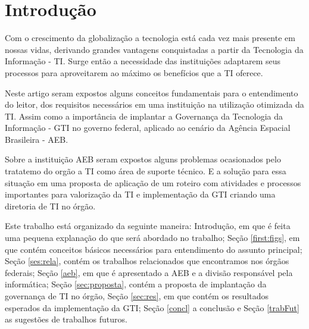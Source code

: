 \section*{Introdução}
Com o crescimento da globalização a tecnologia está cada vez mais presente em nossas vidas, derivando grandes vantagens conquistadas a partir da Tecnologia da Informação - TI. Surge então a necessidade das instituições adaptarem seus processos para aproveitarem ao máximo os benefícios que a TI oferece.  

Neste artigo seram expostos alguns conceitos fundamentais para o entendimento do leitor, dos requisitos necessários em uma instituição na utilização otimizada da TI. Assim como a importância de implantar a Governança da Tecnologia da Informação - GTI no governo federal, aplicado ao cenário da Agência Espacial Brasileira - AEB.

Sobre a instituição AEB seram expostos alguns problemas ocasionados pelo tratatemo do orgão a TI como área de suporte técnico. E a solução para essa situação em uma proposta de aplicação de um roteiro com atividades e processos importantes para valorização da TI e implementação da GTI criando uma diretoria de TI no órgão.

Este trabalho está organizado da seguinte maneira: Introdução, em que é feita uma pequena explanação do que será abordado no trabalho; Seção \ref{first:figs}, em que contém conceitos básicos necessários para entendimento do assunto principal; Seção \ref{ses:rela}, contém os trabalhos relacionados que encontramos nos órgãos federais; Seção \ref{aeb}, em que é apresentado a AEB e a divisão responsável pela informática; Seção \ref{sec:proposta}, contém a proposta de implantação da governança de TI no órgão, Seção \ref{sec:res}, em que contém os resultados esperados da implementação da GTI;  Seção \ref{concl} a conclusão e Seção \ref{trabFut} as sugestões de trabalhos futuros.

